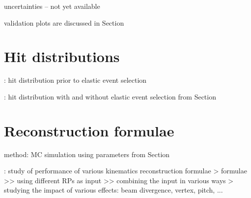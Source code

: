 \> uncertainties -- not yet available
\iffalse
\>> 3 leading eigen modes reproduce the matrix sufficiently well
\>> propagated to relative uncertainties of scattering angles by program "reconstruction\_formulae/print\_optics\_uncertainties"
\>>> left-arm reconstruction: $\si(\de\th^*_x) = 0.00173$, $\si(\de\th^*_y) = 0.00152$
\>>> right-arm reconstruction: $\si(\de\th^*_x) = 0.00175$, $\si(\de\th^*_y) = 0.00152$
\>>> double-arm reconstruction: $\si(\de\th^*_x) = 0.00165$, $\si(\de\th^*_y) = 0.00152$, correlation factor $-90.29\un{\%}$

\>> single-arm perturbations decomposed to modes (program "systematics/optics\_scaling\_matrix")
\>>> relative errors, order: $\th^*_{x,L}$, $\th^*_{y,L}$, $\th^*_{x,R}$, $\th^*_{y,R}$
\>>> mode 1: -1.608E-03, +1.473E-03, -1.630E-03, +1.477E-03
\>>> mode 2: -5.157E-04, +2.541E-05, +5.566E-04, +2.746E-05
\>>> mode 3: +3.617E-04, +3.625E-04, +3.006E-04, +3.641E-04
\fi


\> validation plots are discussed in Section 



\chapter[hit-dist]{Hit distributions}

\> : hit distribution prior to elastic event selection

\> : hit distribution with and without elastic event selection from Section 



\chapter[reco-form]{Reconstruction formulae}

\> method: MC simulation using parameters from Section 

\>  : study of performance of various kinematics reconstruction formulae
\>> formulae
\>>> using different RPs as input
\>>> combining the input in various ways
\>> studying the impact of various effects: beam divergence, vertex, pitch, ...

